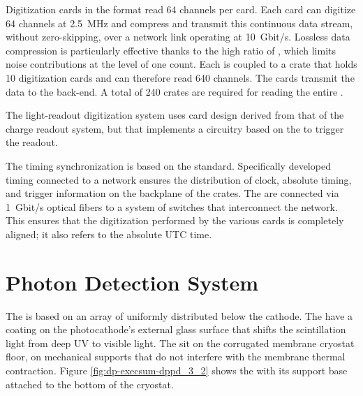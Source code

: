 Digitization cards in the  format read \num{64} channels per card. Each  card can digitize \num{64} channels at \SI{2.5}{MHz} and compress and transmit this continuous data stream, without zero-skipping, over a network link operating at \SI{10}{Gbit/s}. Lossless data compression is particularly effective thanks to the high  ratio  of , which limits noise contributions at the level of one  count. Each  is coupled to a  crate that holds \num{10}  digitization cards and can therefore read  \num{640} channels. The  cards  transmit the data to the  back-end. A total of \num{240}  crates are required for reading the entire .  

The light-readout digitization system uses   card design derived from that of the charge readout system, but that implements a circuitry based on the   to trigger the readout. 


The timing synchronization is based on the  standard. Specifically developed timing  connected to a  network ensures the distribution of clock, absolute timing, and trigger information on the backplane of the  crates. The  are connected via \SI{1}{Gbit/s} optical fibers to a system of  switches that interconnect the  network. This ensures that the digitization performed by the various  cards is completely aligned; it also refers to the absolute UTC time. 





\section{Photon Detection System}
\label{sec:dp-execsum-pd}

The  is based on an array of  uniformly distributed below the cathode. 
The  have a  coating on the photocathode's external glass surface that shifts the scintillation light from deep UV to visible light. The   sit on the corrugated membrane cryostat floor, on 
mechanical supports that do not interfere with the membrane thermal contraction. 
Figure \ref{fig:dp-execsum-dppd_3_2} shows the  with its support base attached to the bottom of the  cryostat.

